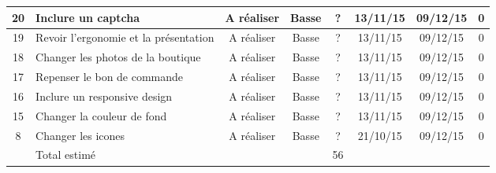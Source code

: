 \begin{tabular}{ | c | p{4cm} | c | c | c | c | c | c |   }
20 & Inclure un captcha & A réaliser & Basse & ? & 13/11/15 &
	09/12/15 & 0 \\ \hline
19 & Revoir l'ergonomie et la présentation & A réaliser & Basse & ? & 13/11/15
	& 09/12/15 & 0  \\ \hline
18 & Changer les photos de la boutique & A réaliser & Basse & ? & 13/11/15 &
	09/12/15 & 0  \\ \hline
17 & Repenser le bon de commande & A réaliser & Basse & ? & 13/11/15 & 09/12/15
	& 0  \\ \hline
16 & Inclure un responsive design & A réaliser & Basse & ? &
	13/11/15 & 09/12/15 & 0  \\ \hline
15 & Changer la couleur de fond & A réaliser & Basse & ? & 13/11/15 & 09/12/15
	& 0  \\ \hline
8 & Changer les icones & A réaliser & Basse & ? & 21/10/15 & 09/12/15 & 0  \\
\hline


& Total estimé &  &  & 56 &  &  & \\ \hline
 \end{tabular}